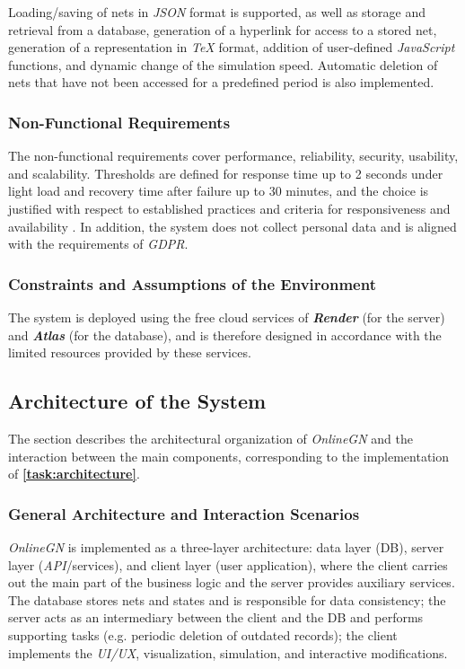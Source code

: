 	Loading/saving of nets in \textit{JSON} format is supported, as well as storage and retrieval from a database, generation of a hyperlink for access to a stored net, generation of a representation in \textit{TeX} format, addition of user-defined \textit{JavaScript} functions, and dynamic change of the simulation speed. Automatic deletion of nets that have not been accessed for a predefined period is also implemented.
	
	\subsubsection{Non-Functional Requirements}
	\hspace*{2.5em}The non-functional requirements cover performance, reliability, security, usability, and scalability. Thresholds are defined for response time up to 2 seconds under light load and recovery time after failure up to 30 minutes, and the choice is justified with respect to established practices and criteria for responsiveness and availability \cite{DIS-Nielsen1993RT}. In addition, the system does not collect personal data and is aligned with the requirements of \textit{GDPR}.
	
	\subsubsection{Constraints and Assumptions of the Environment}
	\hspace*{2.5em}The system is deployed using the free cloud services of \textbf{\textit{Render}} (for the server) and \textbf{\textit{Atlas}} (for the database), and is therefore designed in accordance with the limited resources provided by these services.
	
	\subsection{Architecture of the System}
	
	\hspace*{2.5em}The section describes the architectural organization of \textit{OnlineGN} and the interaction between the main components, corresponding to the implementation of \textbf{\ref{task:architecture}}.
	
	\subsubsection{General Architecture and Interaction Scenarios}
	\hspace*{2.5em}\textit{OnlineGN} is implemented as a three-layer architecture: data layer (DB), server layer (\textit{API}/services), and client layer (user application), where the client carries out the main part of the business logic and the server provides auxiliary services. The database stores nets and states and is responsible for data consistency; the server acts as an intermediary between the client and the DB and performs supporting tasks (e.g. periodic deletion of outdated records); the client implements the \textit{UI/UX}, visualization, simulation, and interactive modifications.
	

